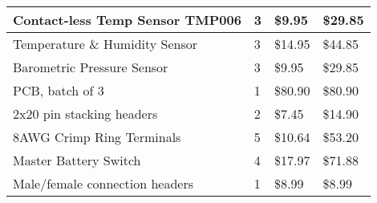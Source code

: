 \begin{longtable}[H]{| L{8.0cm} | P{1.25cm} | P{2.0cm} | P{2.0cm} |}
Contact-less Temp Sensor TMP006	    & 3	    & \$9.95	&   \$29.85     \\\hline
Temperature \& Humidity Sensor 	    & 3	    & \$14.95	&   \$44.85     \\\hline
Barometric Pressure Sensor		    & 3	    & \$9.95	&   \$29.85     \\\hline
PCB, batch of 3                     & 1	    & \$80.90	&   \$80.90     \\\hline
2x20 pin stacking headers			& 2	    & \$7.45	&   \$14.90     \\\hline
8AWG Crimp Ring Terminals			& 5	    & \$10.64	&   \$53.20     \\\hline
Master Battery Switch			    & 4	    & \$17.97	&   \$71.88     \\\hline
Male/female connection headers		& 1	    & \$8.99	&   \$8.99      \\\hline


\end{longtable}

\begin{comment}

TOTAL = \$1.966.64

\end{comment}